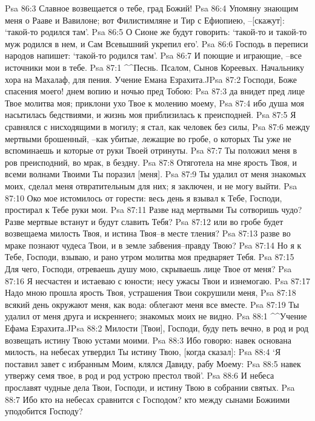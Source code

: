 Psa 86:3  Славное возвещается о тебе, град Божий!
Psa 86:4  Упомяну знающим меня о Рааве и Вавилоне; вот Филистимляне и Тир с Ефиопиею, --[скажут]: `такой-то родился там'.
Psa 86:5  О Сионе же будут говорить: `такой-то и такой-то муж родился в нем, и Сам Всевышний укрепил его'.
Psa 86:6  Господь в переписи народов напишет: `такой-то родился там'.
Psa 86:7  И поющие и играющие, --все источники мои в тебе.
Psa 87:1  ^^Песнь. Псалом, Сынов Кореевых. Начальнику хора на Махалаф, для пения. Учение Емана Езрахита.^^
Psa 87:2  Господи, Боже спасения моего! днем вопию и ночью пред Тобою:
Psa 87:3  да внидет пред лице Твое молитва моя; приклони ухо Твое к молению моему,
Psa 87:4  ибо душа моя насытилась бедствиями, и жизнь моя приблизилась к преисподней.
Psa 87:5  Я сравнялся с нисходящими в могилу; я стал, как человек без силы,
Psa 87:6  между мертвыми брошенный, --как убитые, лежащие во гробе, о которых Ты уже не вспоминаешь и которые от руки Твоей отринуты.
Psa 87:7  Ты положил меня в ров преисподний, во мрак, в бездну.
Psa 87:8  Отяготела на мне ярость Твоя, и всеми волнами Твоими Ты поразил [меня].
Psa 87:9  Ты удалил от меня знакомых моих, сделал меня отвратительным для них; я заключен, и не могу выйти.
Psa 87:10  Око мое истомилось от горести: весь день я взывал к Тебе, Господи, простирал к Тебе руки мои.
Psa 87:11  Разве над мертвыми Ты сотворишь чудо? Разве мертвые встанут и будут славить Тебя?
Psa 87:12  или во гробе будет возвещаема милость Твоя, и истина Твоя--в месте тления?
Psa 87:13  разве во мраке познают чудеса Твои, и в земле забвения--правду Твою?
Psa 87:14  Но я к Тебе, Господи, взываю, и рано утром молитва моя предваряет Тебя.
Psa 87:15  Для чего, Господи, отреваешь душу мою, скрываешь лице Твое от меня?
Psa 87:16  Я несчастен и истаеваю с юности; несу ужасы Твои и изнемогаю.
Psa 87:17  Надо мною прошла ярость Твоя, устрашения Твои сокрушили меня,
Psa 87:18  всякий день окружают меня, как вода: облегают меня все вместе.
Psa 87:19  Ты удалил от меня друга и искреннего; знакомых моих не видно.
Psa 88:1  ^^Учение Ефама Езрахита.^^
Psa 88:2  Милости [Твои], Господи, буду петь вечно, в род и род возвещать истину Твою устами моими.
Psa 88:3  Ибо говорю: навек основана милость, на небесах утвердил Ты истину Твою, [когда сказал]:
Psa 88:4  `Я поставил завет с избранным Моим, клялся Давиду, рабу Моему:
Psa 88:5  навек утвержу семя твое, в род и род устрою престол твой'.
Psa 88:6  И небеса прославят чудные дела Твои, Господи, и истину Твою в собрании святых.
Psa 88:7  Ибо кто на небесах сравнится с Господом? кто между сынами Божиими уподобится Господу?
